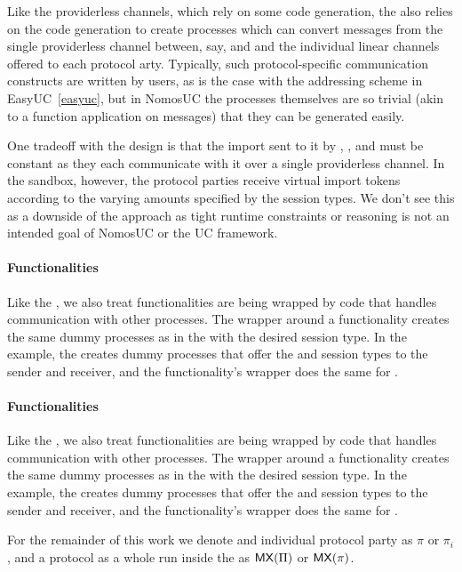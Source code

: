 Like the providerless channels, which rely on some code generation, the \partywrapper also relies on the code generation to create processes which can convert messages from the single providerless channel between, say, \partywrapper and \F  and the individual linear channels offered to each protocol arty.
Typically, such protocol-specific communication constructs are written by users, as is the case with the addressing scheme in EasyUC~\ref{easyuc}, but in NomosUC the processes themselves are so trivial (akin to a function application on messages) that they can be generated easily.

One tradeoff with the \partywrapper design is that the import sent to it by \F, \Z, and \A must be constant as they each communicate with it over a single providerless channel.  
In the sandbox, however, the protocol parties receive virtual import tokens according to the varying amounts specified by the session types.
We don't see this as a downside of the approach as tight runtime constraints or reasoning is not an intended goal of NomosUC or the UC framework.

\paragraph{Functionalities}
Like the \partywrapper, we also treat functionalities are being wrapped by code that handles communication with other processes. The wrapper around a functionality creates the same dummy processes as in the \partywrapper with the desired session type.
In the \Fcom example, the \partywrapper creates dummy processes that offer the  and  session types to the sender and receiver, and the functionality's wrapper does the same for \Fcom. 

\paragraph{Functionalities}
Like the \partywrapper, we also treat functionalities are being wrapped by code that handles communication with other processes. The wrapper around a functionality creates the same dummy processes as in the \partywrapper with the desired session type.
In the \Fcom example, the \partywrapper creates dummy processes that offer the  and  session types to the sender and receiver, and the functionality's wrapper does the same for \Fcom. 

For the remainder of this work we denote and individual protocol party as $\pi$ or $\pi_i$, and a protocol as a whole run inside the \partywrapper as $\mathsf{MX}(\Pi)$ or $\mathsf{MX}(\pi)$.


